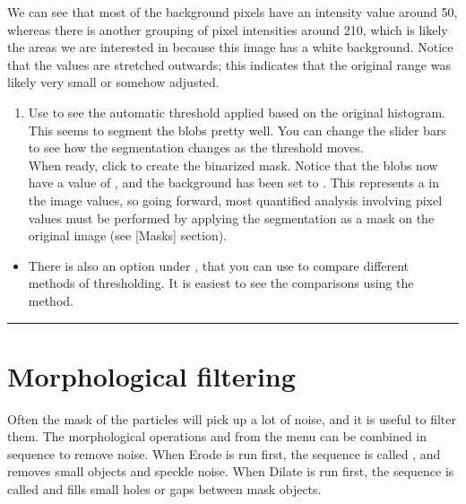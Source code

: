 \documentclass[letterpaper,10pt,english]{jupyterBook}
\begin{document}
\sphinxAtStartPar
{}

\sphinxAtStartPar
We can see that most of the background pixels have an intensity value around 50, whereas there is another grouping of pixel intensities around 210, which is likely the areas we are interested in because this image has a white background. Notice that the values are stretched outwards; this indicates that the original range was likely very small or somehow adjusted.
\begin{enumerate}
%
\setcounter{enumi}{1}
\item {} 
\sphinxAtStartPar
Use  to see the automatic threshold applied based on the original histogram.\\
This seems to segment the blobs pretty well. You can change the slider bars to see how the segmentation changes as the threshold moves.\\
When ready, click  to create the binarized mask. Notice that the blobs now have a value of , and the background has been set to .  This represents a  in the image values, so going forward, most quantified analysis involving pixel values must be performed by applying the segmentation as a mask on the original image (see {[}Masks{]} section).

\end{enumerate}

\sphinxAtStartPar
{}


\begin{itemize}
\item {} 
\sphinxAtStartPar
There is also an  option under , that you can use to compare different methods of thresholding. It is easiest to see the comparisons using the  method.

\end{itemize}

\sphinxAtStartPar
{}


\bigskip\hrule\bigskip



\section{Morphological filtering}
\label{\detokenize{basic-segmentation:morphological-filtering}}
\sphinxAtStartPar
Often the mask of the particles will pick up a lot of noise, and it is useful to filter them. The morphological operations  and  from the menu  can be combined in sequence to remove noise. When Erode is run first, the sequence is called , and removes small objects and speckle noise. When Dilate is run first, the sequence is called  and fills small holes or gaps between mask objects.
\end{document}
